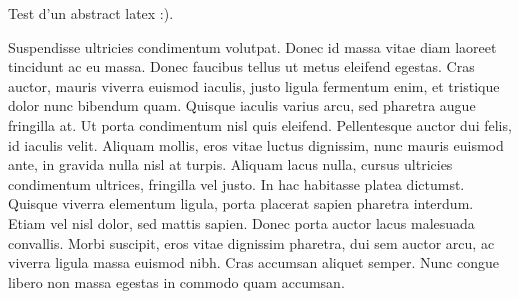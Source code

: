 \textrm{Test d'un abstract latex :).}


Suspendisse ultricies condimentum volutpat. Donec id massa vitae diam laoreet tincidunt ac eu massa. Donec faucibus tellus ut metus eleifend egestas. Cras auctor, mauris viverra euismod iaculis, justo ligula fermentum enim, et tristique dolor nunc bibendum quam. Quisque iaculis varius arcu, sed pharetra augue fringilla at. Ut porta condimentum nisl quis eleifend. Pellentesque auctor dui felis, id iaculis velit. Aliquam mollis, eros vitae luctus dignissim, nunc mauris euismod ante, in gravida nulla nisl at turpis. Aliquam lacus nulla, cursus ultricies condimentum ultrices, fringilla vel justo. In hac habitasse platea dictumst. Quisque viverra elementum ligula, porta placerat sapien pharetra interdum. Etiam vel nisl dolor, sed mattis sapien. Donec porta auctor lacus malesuada convallis. Morbi suscipit, eros vitae dignissim pharetra, dui sem auctor arcu, ac viverra ligula massa euismod nibh. Cras accumsan aliquet semper. Nunc congue libero non massa egestas in commodo quam accumsan. 